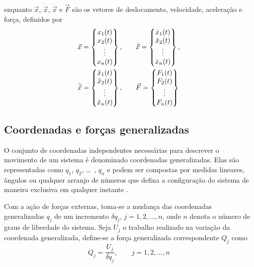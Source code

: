 \documentclass[12pt,openright,oneside,a4paper,
	chapter=TITLE,section=TITLE,
	english,brazil]{abntex2}
\begin{document}
	enquanto $\vec{x}$, $\dot{\vec{x}}$, $\ddot{\vec{x}}$ e $\vec{F}$ são os vetores de deslocamento, velocidade, aceleração e força, definidos por
	\begin{align} \label{eqn:vetores}
		\vec{x} =
		\begin{Bmatrix}
			x_1(t)\\ x_2(t)\\ \vdots\\ x_n(t)\\
		\end{Bmatrix},\qquad &
		\dot{\vec{x}} = 
		\begin{Bmatrix}
			\dot{x}_1(t)\\ \dot{x}_2(t)\\ \vdots\\ \dot{x}_n(t)\\
		\end{Bmatrix}, \notag\\
		\ddot{\vec{x}} = 
		\begin{Bmatrix}
			\ddot{x}_1(t)\\ \ddot{x}_2(t)\\ \vdots \\ \ddot{x}_n(t)\\  
		\end{Bmatrix},\qquad &
		\vec{F} = 
		\begin{Bmatrix}
			F_1(t)\\ F_2(t)\\ \vdots\\ F_n(t)\\
		\end{Bmatrix}
	\end{align}
	
	\subsection{Coordenadas e forças generalizadas} \label{sec:coord-generalizadas}
	O conjunto de coordenadas independentes necessárias para descrever o movimento de um sistema é denominado coordenadas generalizadas. Elas são representadas como $q_1$, $q_2$, \dots\ , $q_n$ e podem ser compostas por medidas lineares, ângulos ou qualquer arranjo de números que defina a configuração do sistema de maneira exclusiva em qualquer instante \cite{rao:2008}.
	
	Com a ação de forças externas, toma-se a mudança das coordenadas generalizadas $q_j$ de um incremento $\delta q_j$, $ j = 1, 2, \dots, n $, onde $n$ denota o número de graus de liberdade do sistema. Seja $U_j$ o trabalho realizado na variação da coordenada generalizada, define-se a força generalizada correspondente $Q_j$ como
	\begin{equation}
		Q_j = \frac{U_j}{\delta q_j},\qquad j = 1, 2, \dots, n
	\end{equation}
	
\end{document}
